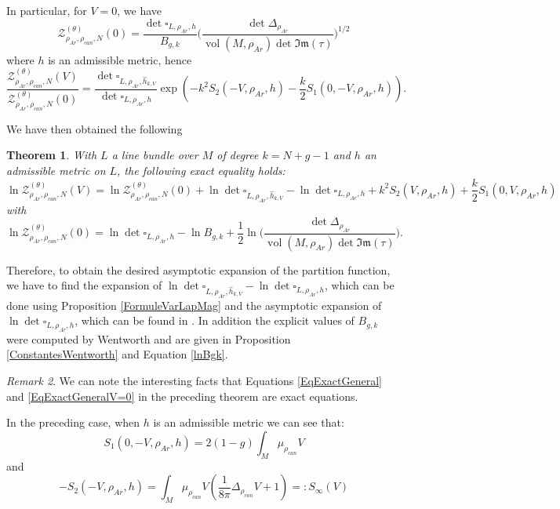 \documentclass{article}
\newtheorem{theorem}{Theorem}[section]
\theoremstyle{definition}
\theoremstyle{remark}
\newtheorem{Remark}[theorem]{Remark}
\DeclareMathOperator{\vol}{vol}
\begin{document}
In particular, for $V=0$, we have 
\begin{equation}
    \mathcal{Z}_{\rho_{Ar},\rho_{can},N}^{(\theta)}(0)=\frac{\det\square_{L,\rho_{Ar},h} }{B_{g,k}}\bigg(\frac{\det\Delta_{\rho_{Ar}}}{\vol(M,\rho_{Ar}) \det \mathfrak{Im}(\tau)}\bigg)^{1/2}
    \end{equation} where $h$ is an admissible metric, hence \begin{equation}
\frac{\mathcal{Z}_{\rho_{Ar},{\rho_{can}},N}^{(\theta)}(V)}{\mathcal{Z}_{\rho_{Ar},\rho_{can},N}^{(\theta)}(0)}=\frac{\det\square_{L,\rho_{Ar},\hat{h}_{k,V}} }{\det\square_{L,\rho_{Ar},h}}\exp\left(-k^{2}S_{2}(-V,\rho_{Ar},h)-\frac{k}{2}S_{1}(0,-V,\rho_{Ar},h) \right).
    \end{equation}

    We have then obtained the following 
    \begin{theorem}\label{TheoremPartitionGénéral}
        With $L$ a line bundle over $M$ of degree $k=N+g-1$ and $h$ an admissible metric on $L$, the following exact equality holds: 
        \begin{equation}\label{EqExactGeneral}
            \ln\mathcal{Z}_{\rho_{Ar},{\rho_{can}},N}^{(\theta)}(V)=\ln \mathcal{Z}_{\rho_{Ar},{\rho_{can}},N}^{(\theta)}(0)+\ln \det\square_{L,\rho_{Ar},\hat{h}_{k,V}}-\ln \det\square_{L,\rho_{Ar},h}+k^{2}S_{2}(V,\rho_{Ar},h)+\frac{k}{2}S_{1}(0,V,\rho_{Ar},h)
        \end{equation}
        with
        \begin{equation}\label{EqExactGeneralV=0}\ln\mathcal{Z}_{\rho_{Ar},\rho_{can},N}^{(\theta)}(0)=\ln\det\square_{L,\rho_{Ar},h} -\ln{B_{g,k}}+\frac{1}{2}\ln \bigg(\frac{\det\Delta_{\rho_{Ar}}}{\vol(M,\rho_{Ar}) \det \mathfrak{Im}(\tau)}\bigg).
        \end{equation}
    \end{theorem}

    Therefore, to obtain the desired asymptotic expansion of the partition function, we have to find the expansion of $\ln \det\square_{L,\rho_{Ar},\hat{h}_{k,V}}-\ln \det\square_{L,\rho_{Ar},h}$, which can be done using Proposition \ref{FormuleVarLapMag} and the asymptotic expansion of $\ln \det\square_{L,\rho_{Ar},h}$, which can be found in \cite{FINSKI20183457}. In addition the explicit values of $B_{g,k}$ were computed by Wentworth \cite{WentworthGluing} and are given in Proposition \ref{ConstantesWentworth} and Equation \eqref{lnBgk}.
\begin{Remark}
    We can note the interesting facts that Equations \eqref{EqExactGeneral} and \eqref{EqExactGeneralV=0} in the preceding theorem are exact equations.  
\end{Remark} 
In the preceding case, when $h$ is an admissible metric we can see that: $$S_{1}(0,-V,\rho_{Ar},h)=2(1-g) \int_{M}\mu_{\rho_{can}} V  $$ and 
\begin{equation}\label{Sinfini}
	-S_{2}(-V,\rho_{Ar},h)=\int_{M}\mu_{\rho_{can}}V\left(\frac{1}{8\pi} \Delta_{\rho_{can}}V + 1\right)=: S_{\infty}(V) 
\end{equation}
\end{document}
